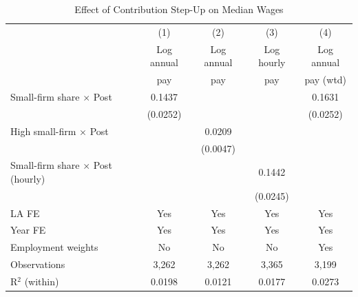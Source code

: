 \begin{table}[t]
\centering
\caption{Effect of Contribution Step-Up on Median Wages}
\label{tab:main}
\begin{tabular}{lcccc}
\toprule
 & (1) & (2) & (3) & (4) \\
 & Log annual & Log annual & Log hourly & Log annual \\
 & pay & pay & pay & pay (wtd) \\
\midrule
Small-firm share $\times$ Post & 0.1437 & & & 0.1631 \\
 & (0.0252) & & & (0.0252) \\
High small-firm $\times$ Post & & 0.0209 & & \\
 & & (0.0047) & & \\
Small-firm share $\times$ Post (hourly) & & & 0.1442 & \\
 & & & (0.0245) & \\
\midrule
LA FE & Yes & Yes & Yes & Yes \\
Year FE & Yes & Yes & Yes & Yes \\
Employment weights & No & No & No & Yes \\
Observations & 3,262 & 3,262 & 3,365 & 3,199 \\
R$^2$ (within) & 0.0198 & 0.0121 & 0.0177 & 0.0273 \\
\bottomrule
\end{tabular}
\par{}
\end{table}
